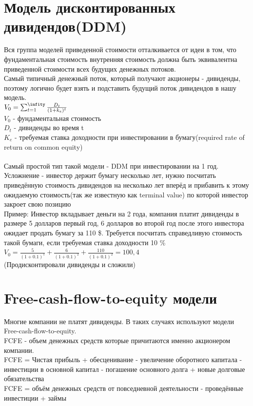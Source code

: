 \documentclass{article}
\begin{document}
\section{Модель дисконтированных дивидендов(DDM)}
Вся группа моделей приведенной стоимости отталкивается от идеи в том, что фундаментальная стоимость внутренняя стоимость должна быть эквивалентна приведенной стоимости всех будущих денежных потоков.\\
Самый типичный денежный поток, который получают акционеры - дивиденды, поэтому логично будет взять и подставить будущий поток дивидендов в нашу модель.\\
$V_0 = \sum_{t=1}^{\infity}\frac{D_t}{(1+k_e)^t}$\\
$V_0$ - фундаментальная стоимость\\
$D_t$ - дивиденды во время t\\
$K_e$ - требуемая ставка доходности при инвестировании в бумагу(required rate of return on common equity)\\
\\
Самый простой тип такой модели - DDM при инвестировании на 1 год.\\
Усложнение - инвестор держит бумагу несколько лет, нужно посчитать приведённую стоимость дивидендов на несколько лет вперёд и прибавить к этому
ожидаемую стоимость(так же известную как terminal value) по которой инвестор закроет свою позицию\\
Пример: Инвестор вкладывает деньги на 2 года, компания платит дивиденды в размере 5 долларов первый год, 6 долларов во второй год после этого инвестора ожидает продать бумагу за 110 \$. Требуется посчитать справедливую стоимость такой бумаги, если требуемая ставка доходности 10 \% 
$V_0 = \frac{5}{(1 + 0.1)^1} + \frac{6}{(1 + 0.1)^2} + \frac{110}{(1 + 0.1)^2} = 100,4$\\
(Продисконтировали дивиденды и сложили)
\section{Free-cash-flow-to-equity модели}
Многие компании не платят дивиденды. В таких случаях используют модели Free-cash-flow-to-equity.\\
FCFE - объем денежных средств которые причитаются именно акционером компании.\\
FCFE = Чистая прибыль + обесценивание - увеличение оборотного капитала - инвестиции в основной капитал -  погашение основного долга + новые долговые обязательства\\
FCFE = объём денежных средств от повседневной деятельности - проведённые инвестиции + займы\\
\end{document}
